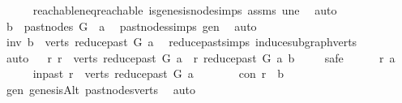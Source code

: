 \begin{isabellebody}
\ \ \ \ \isamarkupfalse%
\ reachable{\isacharunderscore}{\kern0pt}neq{\isacharunderscore}{\kern0pt}reachable{}\ is{\isacharunderscore}{\kern0pt}genesis{\isacharunderscore}{\kern0pt}node{\isachardot}{\kern0pt}simps\ assms{\isacharparenleft}{\kern0pt}{}{\isacharparenright}{\kern0pt}\ une\ \isamarkupfalse%
\ auto\ \isanewline
\ \ \isamarkupfalse%
\ \isamarkupfalse%
\ {\isachardoublequoteopen}b\ {\isasymin}\ {\isacharparenleft}{\kern0pt}past{\isacharunderscore}{\kern0pt}nodes\ G\ \ a{\isacharparenright}{\kern0pt}{\isachardoublequoteclose}\ \isamarkupfalse%
\ past{\isacharunderscore}{\kern0pt}nodes{\isachardot}{\kern0pt}simps\ gen\ \isamarkupfalse%
\ auto\isanewline
\ \ \isamarkupfalse%
\ \isamarkupfalse%
\ inv{\isacharcolon}{\kern0pt}\ {\isachardoublequoteopen}b\ {\isasymin}\ verts\ {\isacharparenleft}{\kern0pt}reduce{\isacharunderscore}{\kern0pt}past\ G\ a{\isacharparenright}{\kern0pt}{\isachardoublequoteclose}\ \isamarkupfalse%
\ reduce{\isacharunderscore}{\kern0pt}past{\isachardot}{\kern0pt}simps\ induce{\isacharunderscore}{\kern0pt}subgraph{\isacharunderscore}{\kern0pt}verts\ \isanewline
\ \ \ \ \isamarkupfalse%
\ auto\isanewline
\ \ \isamarkupfalse%
{\isachardoublequoteopen}{\isasymforall}r{\isachardot}{\kern0pt}\ r\ {\isasymin}\ verts\ {\isacharparenleft}{\kern0pt}reduce{\isacharunderscore}{\kern0pt}past\ G\ a{\isacharparenright}{\kern0pt}\ {\isasymlongrightarrow}\ r\ {\isasymrightarrow}\isactrlsup {\isacharasterisk}{\kern0pt}\isactrlbsub reduce{\isacharunderscore}{\kern0pt}past\ G\ a\isactrlesub \ b{\isachardoublequoteclose}\ \isanewline
\ \ \isamarkupfalse%
\ safe\isanewline
\ \ \ \ \isamarkupfalse%
\ r\ a\isanewline
\ \ \ \ \isamarkupfalse%
\ in{\isacharunderscore}{\kern0pt}past{\isacharcolon}{\kern0pt}\ {\isachardoublequoteopen}r\ {\isasymin}\ verts\ {\isacharparenleft}{\kern0pt}reduce{\isacharunderscore}{\kern0pt}past\ G\ a{\isacharparenright}{\kern0pt}{\isachardoublequoteclose}\isanewline
\ \ \ \ \isamarkupfalse%
\ \isamarkupfalse%
\ con{\isacharcolon}{\kern0pt}\ {\isachardoublequoteopen}r\ {\isasymrightarrow}\isactrlsup {\isacharasterisk}{\kern0pt}\ b{\isachardoublequoteclose}\ \isamarkupfalse%
\ gen\ genesisAlt\ past{\isacharunderscore}{\kern0pt}nodes{\isacharunderscore}{\kern0pt}verts\ \isamarkupfalse%
\ auto\ \ \isanewline

\end{isabellebody}
